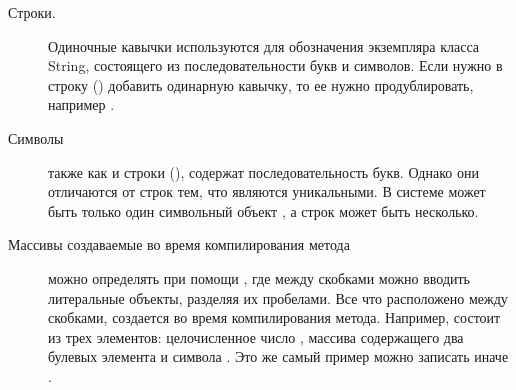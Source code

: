 \documentclass[a4paper,10pt,twoside]{book}
\begin{document}
\begin{description}

\item[Строки.] Одиночные кавычки используются для обозначения экземпляра класса String, состоящего из последовательности букв и символов.
		Если нужно в строку () добавить одинарную кавычку, то ее нужно продублировать, например .


\item[Символы] также как и строки (), содержат последовательность букв.
		Однако они отличаются от строк тем, что являются уникальными.
		В системе может быть только один символьный объект , а строк  может быть несколько.


\item[Массивы создаваемые во время компилирования метода] можно определять при помощи \ct{#()},
		где между скобками можно вводить литеральные объекты, разделяя их пробелами.
		Все что расположено между скобками, создается во время компилирования метода.
		Например,  состоит из трех элементов: целочисленное число , массива содержащего два булевых элемента и символа .
		Это же самый пример можно записать иначе .


\end{description}
\end{document}
